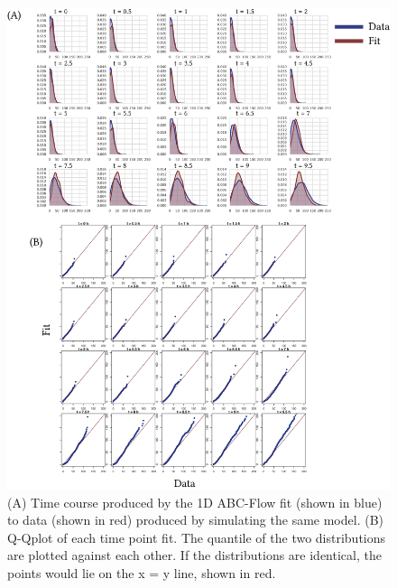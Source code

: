 
\begin{figure}[htbp]
\centering
	\includegraphics[scale=0.9]{../../chapters/chapterABCFlow/images/1D_sim_res.png}
	\caption[ABC-Flow parameter inference for 1D simulated data]{\label{fig:1d-sim-res} (A) Time course produced by the 1D ABC-Flow fit (shown in blue) to data (shown in red) produced by simulating the same model. (B) Q-Qplot of each time point fit. The quantile of the two distributions are plotted against each other. If the distributions are identical, the points would lie on the x = y line, shown in red. }
\end{figure}







